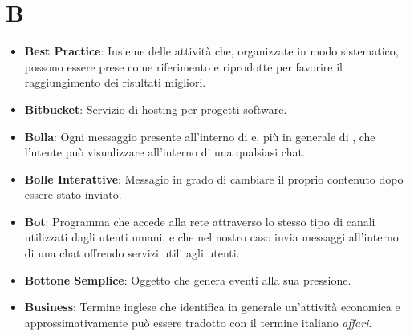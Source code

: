 \section*{B}
\begin{itemize}
	\item
	\textbf{Best Practice}: Insieme delle attività che, organizzate in modo sistematico, possono essere prese come riferimento e riprodotte per favorire il raggiungimento dei risultati migliori.
	\item
	\textbf{Bitbucket}: Servizio di hosting per progetti software.
	\item
	\textbf{Bolla}: Ogni messaggio presente all'interno di  e, più in generale di , che l'utente può visualizzare all'interno di una qualsiasi chat.
	\item
	\textbf{Bolle Interattive}: Messagio in grado di cambiare il proprio contenuto dopo essere stato inviato.
	\item
	\textbf{Bot}: Programma che accede alla rete attraverso lo stesso tipo di canali utilizzati dagli utenti umani, e che nel nostro caso invia messaggi all'interno di una chat offrendo servizi utili agli utenti.
	\item
	\textbf{Bottone Semplice}: Oggetto che genera eventi alla sua pressione.
	\item
	\textbf{Business}: Termine inglese che identifica in generale un'attività economica e approssimativamente può essere tradotto con il termine italiano \textit{affari}.
\end{itemize}
\newpage